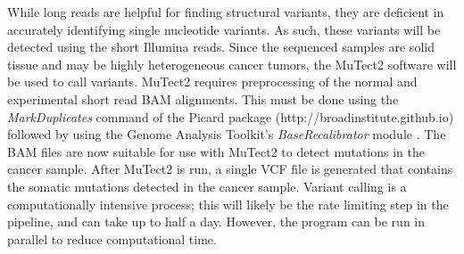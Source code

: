 While long reads are helpful for finding structural variants, they are deficient in accurately identifying single nucleotide variants. As such, these variants will be detected using the short Illumina reads. Since the sequenced samples are solid tissue and may be highly heterogeneous cancer tumors, the MuTect2 \parencite{cibulskis_sensitive_2013} software will be used to call variants.
MuTect2 requires preprocessing of the normal and experimental short read BAM alignments.
This must be done using the \textit{MarkDuplicates} command of the Picard package (http://broadinstitute.github.io) followed by using the Genome Analysis Toolkit's \textit{BaseRecalibrator} module \parencite{mckenna_genome_2010}.
The BAM files are now suitable for use with MuTect2 to detect mutations in the cancer sample. After MuTect2 is run, a single VCF file is generated that contains the somatic mutations detected in the cancer sample.
Variant calling is a computationally intensive process; this will likely be the rate limiting step in the pipeline, and can take up to half a day. However, the program can be run in parallel to reduce computational time.

